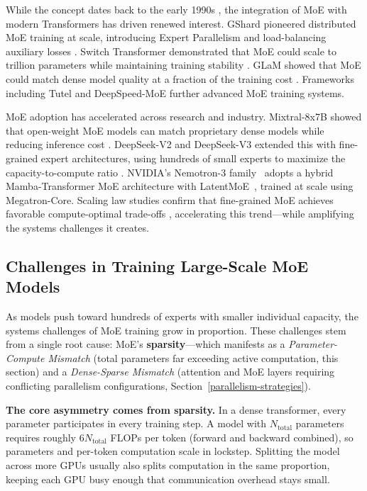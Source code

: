 \documentclass[10pt,logo,copyright]{nvidiatechreport}
\begin{document}
While the concept dates back to the early 1990s \cite{jacobs1991adaptive,eigen2013learning}, the integration of MoE with modern Transformers has driven renewed interest. GShard pioneered distributed MoE training at scale, introducing Expert Parallelism and load-balancing auxiliary losses \cite{lepikhin2020gshard}. Switch Transformer demonstrated that MoE could scale to trillion parameters while maintaining training stability \cite{fedus2022switchtransformersscalingtrillion}. GLaM showed that MoE could match dense model quality at a fraction of the training cost \cite{du2022glamefficientscalinglanguage}. Frameworks including Tutel \cite{hwang2023tutel} and DeepSpeed-MoE \cite{rajbhandari2022deepspeedmoe} further advanced MoE training systems.

MoE adoption has accelerated across research and industry. Mixtral-8x7B showed that open-weight MoE models can match proprietary dense models while reducing inference cost \cite{jiang2024mixtralexperts}. DeepSeek-V2 and DeepSeek-V3 extended this with fine-grained expert architectures, using hundreds of small experts to maximize the capacity-to-compute ratio \cite{dai2024deepseekmoe,deepseekai2024deepseekv2strongeconomicalefficient,deepseekai2025deepseekv3technicalreport}. NVIDIA's Nemotron-3 family~\cite{nvidia2025nemotron3} adopts a hybrid Mamba-Transformer MoE architecture with LatentMoE~\cite{elango2026latentmoe}, trained at scale using Megatron-Core. Scaling law studies confirm that fine-grained MoE achieves favorable compute-optimal trade-offs \cite{krajewski2024scaling,ludziejewski2025jointmoescalinglaws}, accelerating this trend---while amplifying the systems challenges it creates.

\subsection{Challenges in Training Large-Scale MoE Models}\label{sec:challenges}

As models push toward hundreds of experts with smaller individual capacity, the systems challenges of MoE training grow in proportion. These challenges stem from a single root cause: MoE's \textbf{sparsity}---which manifests as a \emph{Parameter-Compute Mismatch} (total parameters far exceeding active computation, this section) and a \emph{Dense-Sparse Mismatch} (attention and MoE layers requiring conflicting parallelism configurations, Section~\ref{parallelism-strategies}).

\textbf{The core asymmetry comes from sparsity.} In a dense transformer, every parameter participates in every training step. A model with $N_{\text{total}}$ parameters requires roughly $6 N_{\text{total}}$ FLOPs per token (forward and backward combined), so parameters and per-token computation scale in lockstep. Splitting the model across more GPUs usually also splits computation in the same proportion, keeping each GPU busy enough that communication overhead stays small.
\end{document}

